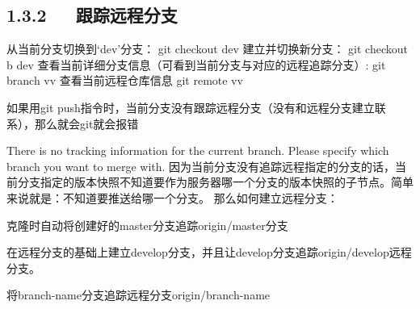 \documentclass[letterpaper,12pt,english]{sphinxmanual}
\begin{document}
\subsection{1.3.2   跟踪远程分支}
\label{\detokenize{001software/001install/001._u7f51_u7ad9/github:id6}}
\begin{sphinxVerbatim}[commandchars=\\\{\}]
从当前分支切换到‘dev’分支：
git checkout dev
建立并切换新分支：
git checkout \PYGZhy{}b \PYGZsq{}dev\PYGZsq{}
查看当前详细分支信息（可看到当前分支与对应的远程追踪分支）:
git branch \PYGZhy{}vv
查看当前远程仓库信息
git remote \PYGZhy{}vv
\end{sphinxVerbatim}

如果用git push指令时，当前分支没有跟踪远程分支（没有和远程分支建立联系），那么就会git就会报错

There is no tracking information for the current branch.
Please specify which branch you want to merge with.
因为当前分支没有追踪远程指定的分支的话，当前分支指定的版本快照不知道要作为服务器哪一个分支的版本快照的子节点。简单来说就是：不知道要推送给哪一个分支。
那么如何建立远程分支：

克隆时自动将创建好的master分支追踪origin/master分支

\begin{sphinxVerbatim}[commandchars=\\\{\}]
  
    
\end{sphinxVerbatim}

在远程分支的基础上建立develop分支，并且让develop分支追踪origin/develop远程分支。

\begin{sphinxVerbatim}[commandchars=\\\{\}]
    
\end{sphinxVerbatim}

将branch-name分支追踪远程分支origin/branch-name

\begin{sphinxVerbatim}[commandchars=\\\{\}]
   
\end{sphinxVerbatim}
\end{document}
